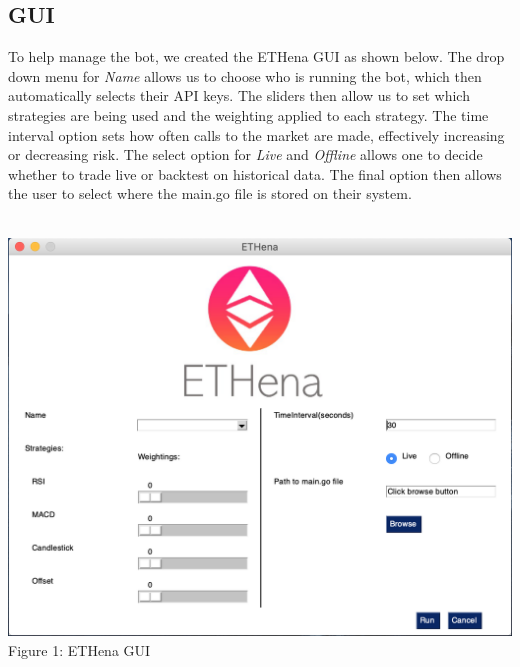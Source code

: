 \documentclass[12pt]{article}
\begin{document}
\begin{multicols}{2}
    \section{GUI}
    To help manage the bot, we created the ETHena GUI as shown below. The drop down menu for \textit{Name} allows us to choose who is running the bot, which then automatically selects their API keys. The sliders then allow us to set which strategies are being used and the weighting applied to each strategy. The time interval option sets how often calls to the market are made, effectively increasing or decreasing risk. The select option for \textit{Live} and \textit{Offline} allows one to decide whether to trade live or backtest on historical data. The final option then allows the user to select where the main.go file is stored on their system.\\\\
    
    
    \begin{minipage}[b]{1\linewidth}
        \includegraphics[width =\textwidth]{GUI-Image.png}
        \centering
        Figure 1: ETHena GUI
    \end{minipage}


\end{multicols}
\end{document}

